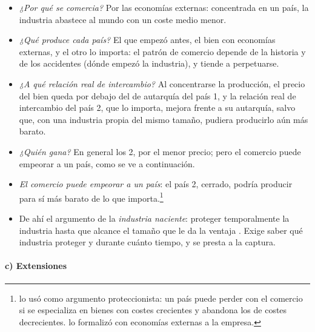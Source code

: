 \documentclass[11pt]{article}
\begin{document}
\begin{itemize}
\item \emph{¿Por qué se comercia?} Por las economías externas: concentrada en un país, la industria abastece al mundo con un coste medio menor.
\item \emph{¿Qué produce cada país?} El que empezó antes, el bien con economías externas, y el otro lo importa: el patrón de comercio depende de la historia y de los accidentes (dónde empezó la industria), y tiende a perpetuarse.
\item \emph{¿A qué relación real de intercambio?} Al concentrarse la producción, el precio del bien queda por debajo del de autarquía del país 1, y la relación real de intercambio del país 2, que lo importa, mejora frente a su autarquía, salvo que, con una industria propia del mismo tamaño, pudiera producirlo aún más barato.
\item \emph{¿Quién gana?} En general los 2, por el menor precio; pero el comercio puede empeorar a un país, como se ve a continuación.
\item \emph{El comercio puede empeorar a un país}: el país 2, cerrado, podría producir para sí más barato de lo que importa\nocite{Graham1923Some}.\footnote{\textcite{Graham1923Some} lo usó como argumento proteccionista: un país puede perder con el comercio si se especializa en bienes con costes crecientes y abandona los de costes decrecientes. \textcite{Ethier1982Decreasing} lo formalizó con economías externas a la empresa.}
\item De ahí el argumento de la \emph{industria naciente}: proteger temporalmente la industria hasta que alcance el tamaño que le da la ventaja . Exige saber qué industria proteger y durante cuánto tiempo, y se presta a la captura.
\end{itemize}

\paragraph{c) Extensiones}
\end{document}
